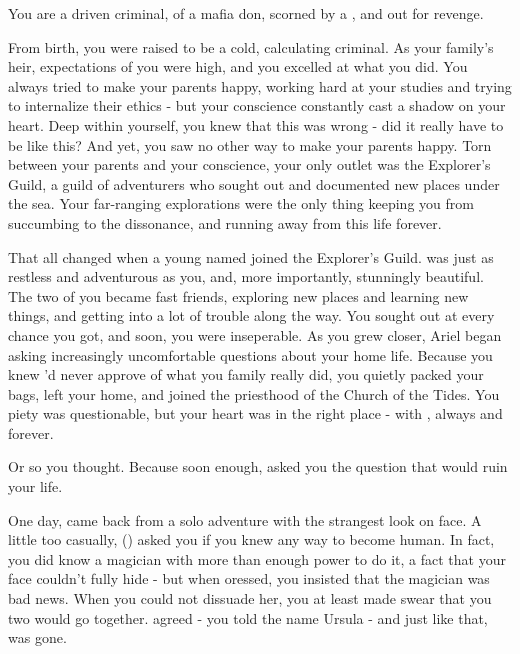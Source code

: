 \documentclass[char]{NeptuneBall}
\begin{document}
\name{\cPriest{}}


You are a driven criminal, \cPriest{\son} of a mafia don, scorned by a \cAriel{\Prince}, and out for revenge.

From birth, you were raised to be a cold, calculating criminal. As your family's heir, expectations of you were high, and you excelled at what you did. You always tried to make your parents happy, working hard at your studies and trying to internalize their ethics - but your conscience constantly cast a shadow on your heart. Deep within yourself, you knew that this was wrong - did it really have to be like this? And yet, you saw no other way to make your parents happy. Torn between your parents and your conscience, your only outlet was the Explorer's Guild, a guild of adventurers who sought out and documented new places under the sea. Your far-ranging explorations were the only thing keeping you from succumbing to the dissonance, and running away from this life forever.

That all changed when a young \cAriel{\Prince} named \cAriel{} joined the Explorer's Guild. \cAriel{\they} was just as restless and adventurous as you, and, more importantly, stunningly beautiful. The two of you became fast friends, exploring new places and learning new things, and getting into a lot of trouble along the way. You sought \cAriel{\them} out at every chance you got, and soon, you were inseperable. As you grew closer, Ariel began asking increasingly uncomfortable questions about your home life. Because you knew \cAriel{\they}'d never approve of what you family really did, you quietly packed your bags, left your home, and joined the priesthood of the Church of the Tides. You piety was questionable, but your heart was in the right place - with \cAriel{}, always and forever.

Or so you thought. Because soon enough, \cAriel{} asked you the question that would ruin your life. 

One day, \cAriel{} came back from a solo adventure with the strangest look on \cAriel{\their} face. A little too casually, \cAriel(\they) asked you if you knew any way to become human. In fact, you did know a magician with more than enough power to do it, a fact that your face couldn't fully hide - but when \cAriel{\they} oressed, you insisted that the magician was bad news. When you could not dissuade her, you at least made \cAriel{\them} swear that you two would go together. \cArial{\they} agreed - you told \cAriel{\them} the name Ursula - and just like that, \cAriel{\they} was gone. 
\end{document}
